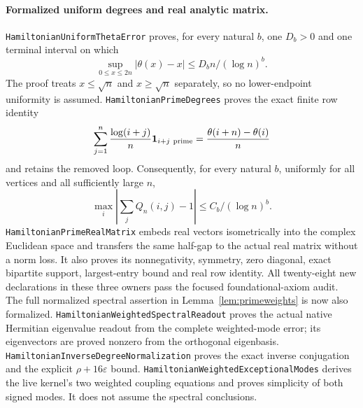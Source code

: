 \paragraph{Formalized uniform degrees and real analytic matrix.}
\texttt{HamiltonianUniformThetaError} proves, for every natural
\(b\), one \(D_b>0\) and one terminal interval on which
\[
 \sup_{0\leq x\leq2n}|\theta(x)-x|
                      \leq D_b n/(\log n)^b.
\]
The proof treats \(x\leq\sqrt n\) and
\(x\geq\sqrt n\) separately, so no lower-endpoint uniformity
is assumed. \texttt{HamiltonianPrimeDegrees} proves the exact
finite row identity
\[
 \sum_{j=1}^n\frac{\log(i+j)}n\mathbf1_{i+j\ {\rm prime}}
       =\frac{\theta(i+n)-\theta(i)}n
\]
and retains the removed loop. Consequently, for every natural
\(b\), uniformly for all vertices and all sufficiently large \(n\),
\[
 \max_i\left|\sum_j Q_n(i,j)-1\right|
                         \leq C_b/(\log n)^b.
\]
\texttt{HamiltonianPrimeRealMatrix} embeds real vectors
isometrically into the complex Euclidean space and transfers the
same half-gap to the actual real matrix without a norm loss.
It also proves its nonnegativity, symmetry, zero diagonal,
exact bipartite support, largest-entry bound and real row identity.
All twenty-eight new declarations in these three owners pass the
focused foundational-axiom audit.
The full normalized spectral assertion in Lemma~\ref{lem:primeweights}
is now also formalized.
\texttt{HamiltonianWeightedSpectralReadout} proves the actual native
Hermitian eigenvalue readout from the complete weighted-mode error;
its eigenvectors are proved nonzero from the orthogonal eigenbasis.
\texttt{HamiltonianInverseDegreeNormalization} proves the exact
inverse conjugation and the explicit \(\rho+16\varepsilon\) bound.
\texttt{HamiltonianWeightedExceptionalModes} derives the live
kernel's two weighted coupling equations and proves simplicity of
both signed modes. It does not assume the spectral conclusions.

